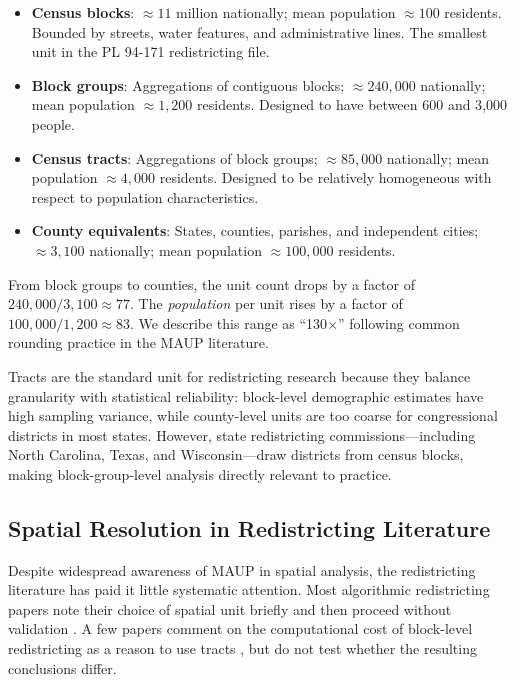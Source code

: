 \begin{itemize}
  \item \textbf{Census blocks}: $\approx 11$ million nationally; mean
        population $\approx 100$ residents.  Bounded by streets, water
        features, and administrative lines.  The smallest unit in the PL
        94-171 redistricting file.
  \item \textbf{Block groups}: Aggregations of contiguous blocks; $\approx
        240{,}000$ nationally; mean population $\approx 1{,}200$ residents.
        Designed to have between 600 and 3{,}000 people.
  \item \textbf{Census tracts}: Aggregations of block groups; $\approx
        85{,}000$ nationally; mean population $\approx 4{,}000$ residents.
        Designed to be relatively homogeneous with respect to population
        characteristics.
  \item \textbf{County equivalents}: States, counties, parishes, and
        independent cities; $\approx 3{,}100$ nationally; mean population
        $\approx 100{,}000$ residents.
\end{itemize}

From block groups to counties, the unit count drops by a factor of
$240{,}000 / 3{,}100 \approx 77$.  The \emph{population} per unit rises by
a factor of $100{,}000 / 1{,}200 \approx 83$.  We describe this range as
``130$\times$'' following common rounding practice in the MAUP literature.

Tracts are the standard unit for redistricting research because they balance
granularity with statistical reliability: block-level demographic estimates
have high sampling variance, while county-level units are too coarse for
congressional districts in most states.  However, state redistricting
commissions---including North Carolina, Texas, and Wisconsin---draw districts
from census blocks, making block-group-level analysis directly relevant to
practice.

\subsection{Spatial Resolution in Redistricting Literature}

Despite widespread awareness of MAUP in spatial analysis, the redistricting
literature has paid it little systematic attention.  Most algorithmic
redistricting papers note their choice of spatial unit briefly and then
proceed without validation \citep{chen2013unintentional,
deford2021computational, mattingly2014}.  A few papers comment on the
computational cost of block-level redistricting as a reason to use tracts
\citep{altman2011bqap}, but do not test whether the resulting conclusions
differ.


